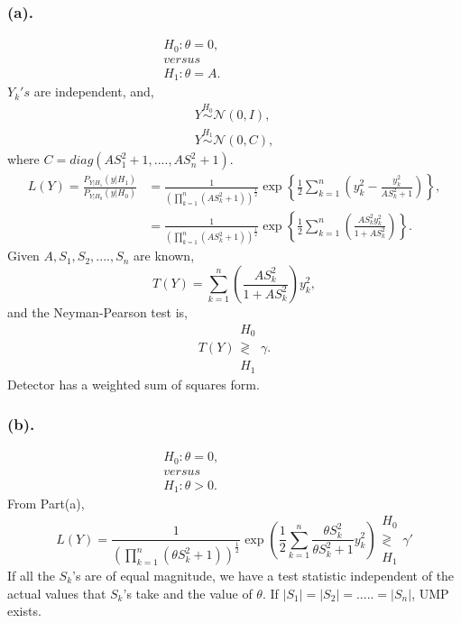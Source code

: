 \documentclass[a4paper,english,12pt]{article}
\begin{document}
\subsubsection*{(a).}
\begin{gather*}
H_0: \theta=0,\\
versus\hspace{100pt}\\
H_1: \theta=A.
\end{gather*}
$Y_k's$ are independent, and,
\begin{gather*}
Y\overset{H_0}{\sim} \mathcal{N}(0,I),\\
Y\overset{H_1}{\sim} \mathcal{N}(0,C),
\end{gather*}
where $C=diag(AS_1^2+1,....,AS_n^2+1)$.
\begin{align*}
L(Y)=\frac{P_{{Y}|{H_1}}\left({y}|{H_1}\right)}{P_{{Y}|{H_0}}\left({y}|{H_0}\right)}&=\frac{1}{\left(\prod\limits_{k=1}
^{n}(AS_k^2+1)\right)^\frac{1}{2}}\exp\left\{\frac{1}{2}\sum\limits_{k=1}^n\left(y_k^2-\frac{y_k^2}{AS_k^2+1}\right)\right\},\\
&=\frac{1}{\left(\prod\limits_{k=1}
^{n}(AS_k^2+1)\right)^\frac{1}{2}}\exp\left\{\frac{1}{2}\sum\limits_{k=1}^n\left(\frac{AS_k^2y_k^2}{1+AS_k^2}\right) \right\}.
\end{align*}
Given $A,S_1,S_2,....,S_n$ are known,
\begin{equation*}
T(Y)=\sum\limits_{k=1}^n\left(\frac{AS_k^2}{1+AS_k^2}\right)y_k^2,
\end{equation*}
and the Neyman-Pearson test is,
\begin{equation*}
T(Y) \substack{H_0\\\gtrless\\ H_1} \gamma.
\end{equation*}
Detector has a weighted sum of squares form.
\subsubsection*{(b).}
\begin{gather*}
H_0: \theta=0,\\
versus\hspace{100pt}\\
H_1: \theta>0.
\end{gather*}
From Part(a),
\begin{equation*}
L(Y)=\frac{1}{\left(\prod\limits_{k=1}
^{n}(\theta S_k^2+1)\right)^\frac{1}{2}}\exp\left(\frac{1}{2}\sum\limits_{k=1}^n\frac{\theta S_k^2}{\theta S_k^2+1}y_k^2\right)\substack{H_0\\\gtrless\\ H_1}\gamma'
\end{equation*}
If all the $S_k$'s are of equal magnitude, we have a test statistic independent of the actual values that $S_k$'s take and the value of $\theta$. If $|S_1|=|S_2|=.....=|S_n|$, UMP exists.
\end{document}
